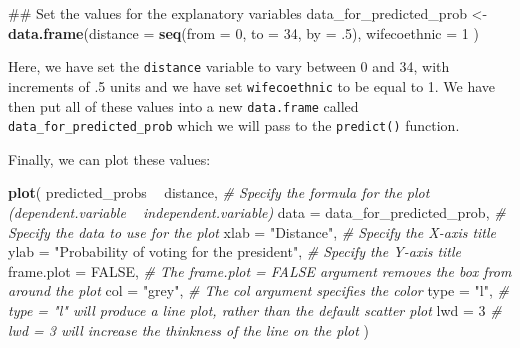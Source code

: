 \documentclass[]{article}
\newenvironment{Shaded}{\begin{snugshade}}{\end{snugshade}}
\newcommand{\KeywordTok}[1]{\textcolor[rgb]{0.13,0.29,0.53}{\textbf{#1}}}
\newcommand{\DataTypeTok}[1]{\textcolor[rgb]{0.13,0.29,0.53}{#1}}
\newcommand{\DecValTok}[1]{\textcolor[rgb]{0.00,0.00,0.81}{#1}}
\newcommand{\StringTok}[1]{\textcolor[rgb]{0.31,0.60,0.02}{#1}}
\newcommand{\CommentTok}[1]{\textcolor[rgb]{0.56,0.35,0.01}{\textit{#1}}}
\newcommand{\OtherTok}[1]{\textcolor[rgb]{0.56,0.35,0.01}{#1}}
\newcommand{\OperatorTok}[1]{\textcolor[rgb]{0.81,0.36,0.00}{\textbf{#1}}}
\newcommand{\NormalTok}[1]{#1}
\theoremstyle{definition}
\theoremstyle{definition}
\theoremstyle{definition}
\theoremstyle{remark}
\begin{document}
\begin{Shaded}
\begin{Highlighting}[]
\NormalTok{## Set the values for the explanatory variables}
\NormalTok{data_for_predicted_prob <-}\StringTok{ }\KeywordTok{data.frame}\NormalTok{(}\DataTypeTok{distance =} \KeywordTok{seq}\NormalTok{(}\DataTypeTok{from =} \DecValTok{0}\NormalTok{, }\DataTypeTok{to =} \DecValTok{34}\NormalTok{, }\DataTypeTok{by =}\NormalTok{ .}\DecValTok{5}\NormalTok{),}
                                     \DataTypeTok{wifecoethnic =} \DecValTok{1}
\NormalTok{                                     )}
\end{Highlighting}
\end{Shaded}

Here, we have set the \texttt{distance} variable to vary between 0 and
34, with increments of .5 units and we have set \texttt{wifecoethnic} to
be equal to 1. We have then put all of these values into a new
\texttt{data.frame} called \texttt{data\_for\_predicted\_prob} which we
will pass to the \texttt{predict()} function.

\begin{Shaded}
\end{Shaded}

Finally, we can plot these values:

\begin{Shaded}
\begin{Highlighting}[]
\KeywordTok{plot}\NormalTok{(}
\NormalTok{  predicted_probs }\OperatorTok{~}\StringTok{ }\NormalTok{distance, }\CommentTok{# Specify the formula for the plot (dependent.variable ~ independent.variable)}
  \DataTypeTok{data =}\NormalTok{ data_for_predicted_prob, }\CommentTok{# Specify the data to use for the plot}
  \DataTypeTok{xlab =} \StringTok{"Distance"}\NormalTok{, }\CommentTok{# Specify the X-axis title}
  \DataTypeTok{ylab =} \StringTok{"Probability of voting for the president"}\NormalTok{, }\CommentTok{# Specify the Y-axis title}
  \DataTypeTok{frame.plot =} \OtherTok{FALSE}\NormalTok{, }\CommentTok{# The frame.plot = FALSE argument removes the box from around the plot}
  \DataTypeTok{col =} \StringTok{"grey"}\NormalTok{, }\CommentTok{# The col argument specifies the color}
  \DataTypeTok{type =} \StringTok{"l"}\NormalTok{, }\CommentTok{# type = "l" will produce a line plot, rather than the default scatter plot}
  \DataTypeTok{lwd =} \DecValTok{3} \CommentTok{# lwd = 3 will increase the thinkness of the line on the plot}
\NormalTok{)}
\end{Highlighting}
\end{Shaded}
\end{document}
